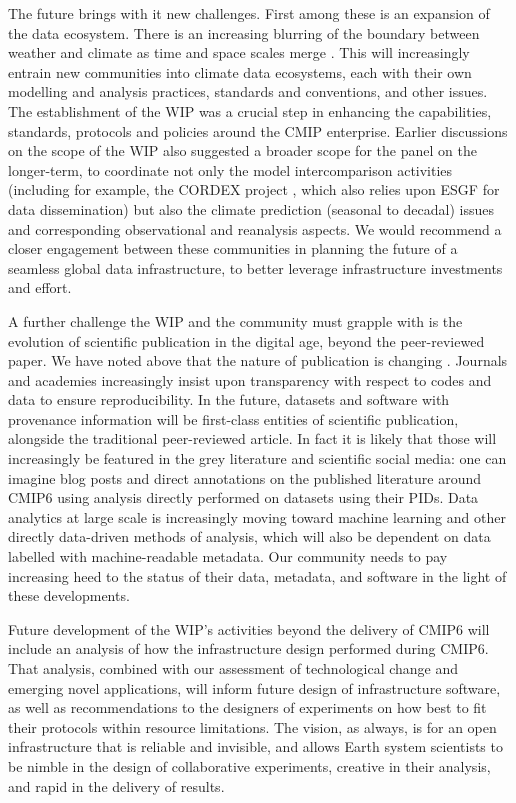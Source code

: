 \documentclass[gmd,manuscript]{copernicus}
\begin{document}
The future brings with it new challenges. First among these is an
expansion of the data ecosystem. There is an increasing blurring of
the boundary between weather and climate as time and space scales
merge \citep{ref:hoskins2013}. This will increasingly entrain new
communities into
climate data ecosystems, each with their own modelling and analysis
practices, standards and conventions, and other issues. The
establishment of the WIP was a crucial step in enhancing the
capabilities, standards, protocols and policies around the CMIP
enterprise. Earlier discussions on the scope of the WIP also suggested
a broader scope for the panel on the longer-term, to coordinate not
only the model intercomparison activities (including for example, the
CORDEX project \citep{ref:lakeetal2017}, which also relies upon ESGF
for data dissemination) but also the climate prediction (seasonal to
decadal) issues and corresponding observational and reanalysis
aspects. We would recommend a closer engagement between these
communities in planning the future of a seamless global data
infrastructure, to better leverage infrastructure investments and effort.

A further challenge the WIP and the community must grapple with is
the evolution of scientific publication in the digital age, beyond the
peer-reviewed paper. We have noted above that the nature of
publication is changing \citep[see e.g][]{ref:davidetal2016}. Journals
and academies increasingly insist upon transparency with respect to
codes and data to ensure reproducibility. In the future, datasets and
software with provenance information will be first-class entities of
scientific publication, alongside the traditional peer-reviewed
article. In fact it is likely that those will increasingly be featured in
the grey literature and scientific social media: one can imagine blog
posts and direct annotations on the published literature around CMIP6
using analysis directly performed on datasets using their PIDs. Data
analytics at large scale is increasingly moving toward machine
learning and other directly data-driven methods of analysis, which
will also be dependent on data labelled with machine-readable metadata.
Our community needs to pay increasing heed to the status of their
data, metadata, and software in the light of these developments.

Future development of the WIP's activities beyond the delivery of
CMIP6 will include an analysis of how the infrastructure design
performed during CMIP6. That analysis, combined with our assessment of
technological change and emerging novel applications, will inform
future design of infrastructure software, as well as recommendations
to the designers of experiments on how best to fit their protocols
within resource limitations. The vision, as always, is for an open
infrastructure that is reliable and invisible, and allows Earth system
scientists to be nimble in the design of collaborative experiments,
creative in their analysis, and rapid in the delivery of results.
\end{document}
